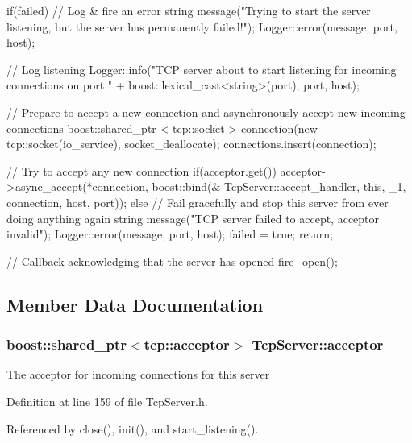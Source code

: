 \begin{DoxyCode}
{
    if(failed)
    {
        // Log & fire an error
        string message("Trying to start the server listening, but the server has 
      permanently failed!");
        Logger::error(message, port, host);
    }

    // Log listening
    Logger::info("TCP server about to start listening for incoming connections on
       port "
            + boost::lexical_cast<string>(port), port, host);

    // Prepare to accept a new connection and asynchronously accept new incoming 
      connections
    boost::shared_ptr < tcp::socket > connection(new tcp::socket(io_service), 
      socket_deallocate);
    connections.insert(connection);

    // Try to accept any new connection
    if(acceptor.get())
    {
        acceptor->async_accept(*connection, boost::bind(&
      TcpServer::accept_handler, this, _1, connection, host, port));
    }
    else
    {
        // Fail gracefully and stop this server from ever doing anything again
        string message("TCP server failed to accept, acceptor invalid");
        Logger::error(message, port, host);
        failed = true;
        return;
    }

    // Callback acknowledging that the server has opened
    fire_open();
}
\end{DoxyCode}


\subsection{Member Data Documentation}
\hypertarget{classTcpServer_aa6b754f18b1c444bf6f1af263be18f33}{
\subsubsection[{acceptor}]{\setlength{\rightskip}{0pt plus 5cm}boost::shared\_\-ptr$<$tcp::acceptor$>$ {\bf TcpServer::acceptor}}}
\label{classTcpServer_aa6b754f18b1c444bf6f1af263be18f33}
The acceptor for incoming connections for this server 

Definition at line 159 of file TcpServer.h.



Referenced by close(), init(), and start\_\-listening().


